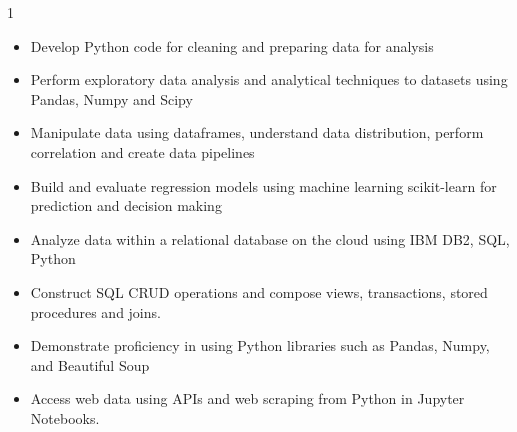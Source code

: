 \documentclass[11pt,a4paper,ragged2e]{altacv}
\begin{document}
\begin{paracol}{1}



\medskip

\begin{itemize}
\item Develop Python code for cleaning and preparing data for analysis 
\item Perform exploratory data analysis and analytical techniques to datasets using Pandas, Numpy and Scipy
\item Manipulate data using dataframes, understand data distribution, perform correlation and create data pipelines
\item Build and evaluate regression models using machine learning scikit-learn for prediction and decision making
\end{itemize}
\tightdivider

\begin{itemize}
\item Analyze data within a relational database on the cloud using IBM DB2, SQL, Python
\item Construct SQL CRUD operations and compose views, transactions, stored procedures and joins.
\end{itemize}
\tightdivider

\begin{itemize}
\item Demonstrate proficiency in using Python libraries such as Pandas, Numpy, and Beautiful Soup
\item Access web data using APIs and web scraping from Python in Jupyter Notebooks.
\end{itemize}


\end{paracol}
\end{document}
